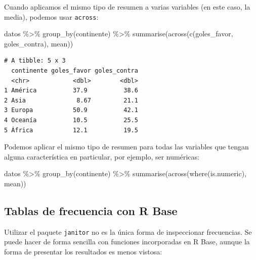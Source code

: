\documentclass[
]{book}
\newenvironment{Shaded}{\begin{snugshade}}{\end{snugshade}}
\newcommand{\CommentTok}[1]{\textcolor[rgb]{0.56,0.35,0.01}{\textit{#1}}}
\newcommand{\FunctionTok}[1]{\textcolor[rgb]{0.00,0.00,0.00}{#1}}
\newcommand{\NormalTok}[1]{#1}
\newcommand{\OtherTok}[1]{\textcolor[rgb]{0.56,0.35,0.01}{#1}}
\newcommand{\SpecialCharTok}[1]{\textcolor[rgb]{0.00,0.00,0.00}{#1}}
\begin{document}
Cuando aplicamos el mismo tipo de resumen a varias variables (en este caso, la media), podemos usar \texttt{across}:

\begin{Shaded}
\begin{Highlighting}[]
\NormalTok{datos }\SpecialCharTok{\%\textgreater{}\%} 
    \FunctionTok{group\_by}\NormalTok{(continente) }\SpecialCharTok{\%\textgreater{}\%} 
    \FunctionTok{summarise}\NormalTok{(}\FunctionTok{across}\NormalTok{(}\FunctionTok{c}\NormalTok{(goles\_favor, goles\_contra), mean))}
\end{Highlighting}
\end{Shaded}

\begin{verbatim}
# A tibble: 5 x 3
  continente goles_favor goles_contra
  <chr>            <dbl>        <dbl>
1 América          37.9          38.6
2 Asia              8.67         21.1
3 Europa           50.9          42.1
4 Oceanía          10.5          25.5
5 África           12.1          19.5
\end{verbatim}

Podemos aplicar el mismo tipo de resumen para todas las variables que tengan alguna característica en particular, por ejemplo, ser numéricas:

\begin{Shaded}
\begin{Highlighting}[]
\NormalTok{datos }\SpecialCharTok{\%\textgreater{}\%} 
    \FunctionTok{group\_by}\NormalTok{(continente) }\SpecialCharTok{\%\textgreater{}\%} 
    \FunctionTok{summarise}\NormalTok{(}\FunctionTok{across}\NormalTok{(}\FunctionTok{where}\NormalTok{(is.numeric), mean))}
\end{Highlighting}
\end{Shaded}

\hypertarget{tablas-de-frecuencia-con-r-base}{%
\subsection{Tablas de frecuencia con R Base}\label{tablas-de-frecuencia-con-r-base}}

Utilizar el paquete \texttt{janitor} no es la única forma de inspeccionar frecuencias. Se puede hacer de forma sencilla con funciones incorporadas en R Base, aunque la forma de presentar los resultados es menos vistosa:

\begin{Shaded}
\end{Shaded}
\end{document}

